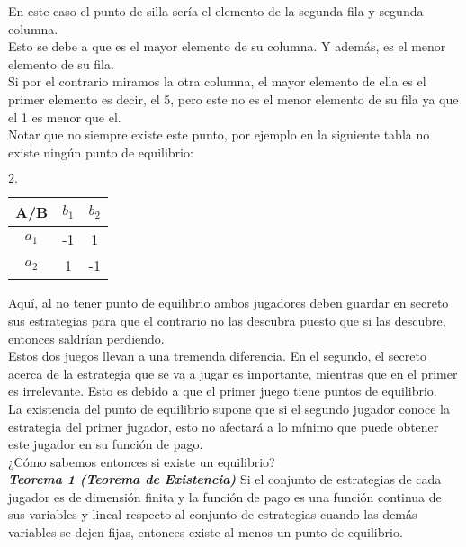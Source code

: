 \documentclass[10pt,a4paper]{book}
\begin{document}
En este caso el punto de silla sería el elemento de la segunda fila y segunda columna. \\
Esto se debe a que es el mayor elemento de su columna. Y además, es el menor elemento de su fila. \\
Si por el contrario miramos la otra columna, el mayor elemento de ella es el primer elemento es decir, el 5, pero este no es el menor elemento de su fila ya que el 1 es menor que el.\\


Notar que no siempre existe este punto, por ejemplo en la siguiente tabla no existe ningún punto de equilibrio:

\begin{center}
		$2. \quad$
	\begin{tabular}{|c|c|c|}
		\hline
		A/B & $b_1$ & $b_2$ \\
		\hline
		$a_1$ & -1 & 1 \\
		\hline
		$a_2$ & 1 & -1 \\
		\hline
	\end{tabular}
\end{center}

Aquí, al no tener punto de equilibrio ambos jugadores deben guardar en secreto sus estrategias para que el contrario no las descubra puesto que si las descubre, entonces saldrían perdiendo.\\

Estos dos juegos llevan a una tremenda diferencia. En el segundo, el secreto acerca de la estrategia que se va a jugar es importante, mientras que en el primer es irrelevante. Esto es debido a que el primer juego tiene puntos de equilibrio.\\

La existencia del punto de equilibrio supone que si el segundo jugador conoce la estrategia del primer jugador, esto no afectará a lo mínimo que puede obtener este jugador en su función de pago.\\



¿Cómo sabemos entonces si existe un equilibrio?\\

\textit{\textbf{Teorema 1 (Teorema de Existencia)}} Si el conjunto de estrategias de cada jugador es de dimensión finita y la función de pago es una función continua de sus variables y lineal respecto al conjunto de estrategias cuando las demás variables se dejen fijas, entonces existe al menos un punto de equilibrio.\\
\end{document}
